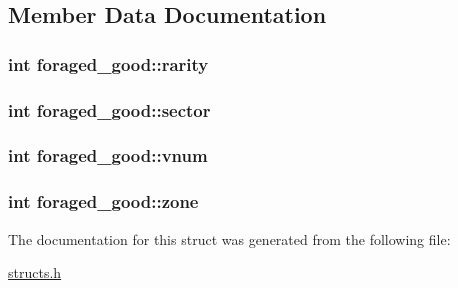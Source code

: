 \subsection{Member Data Documentation}
\hypertarget{structforaged__good_a3e08c212f45ae6ff9c16282a9f197881}{
\subsubsection[{rarity}]{\setlength{\rightskip}{0pt plus 5cm}int foraged\-\_\-good\-::rarity}}\label{structforaged__good_a3e08c212f45ae6ff9c16282a9f197881}
\hypertarget{structforaged__good_aba241a8d71a1882473ca9dbe08292501}{
\subsubsection[{sector}]{\setlength{\rightskip}{0pt plus 5cm}int foraged\-\_\-good\-::sector}}\label{structforaged__good_aba241a8d71a1882473ca9dbe08292501}
\hypertarget{structforaged__good_a5bbeb8524fc3c9374aa117184cb22a83}{
\subsubsection[{vnum}]{\setlength{\rightskip}{0pt plus 5cm}int foraged\-\_\-good\-::vnum}}\label{structforaged__good_a5bbeb8524fc3c9374aa117184cb22a83}
\hypertarget{structforaged__good_a79e769df8c2d4b3c49e819bb92bdeb9d}{
\subsubsection[{zone}]{\setlength{\rightskip}{0pt plus 5cm}int foraged\-\_\-good\-::zone}}\label{structforaged__good_a79e769df8c2d4b3c49e819bb92bdeb9d}


The documentation for this struct was generated from the following file\-:\begin{DoxyCompactItemize}
\item 
\hyperlink{structs_8h}{structs.\-h}\end{DoxyCompactItemize}
